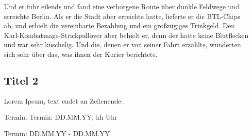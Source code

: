 Und er fuhr eilends und fand eine verborgene Route über dunkle Feldwege und erreichte Berlin.
Als er die Stadt aber erreichte hatte, lieferte er die BTL-Chips ab, und erhielt die vereinbarte Bezahlung und ein großzügiges Trinkgeld.
Den Karl-Kombatmage-Strickpullover aber behielt er, denn der hatte keine Blutflecken und war sehr kuschelig.
Und die, denen er von seiner Fahrt erzählte, wunderten sich sehr über das, was ihnen der Kurier berichtete.



\subsection{Titel 2}
Lorem Ipsum, text endet an Zeilenende.


\begin{termine}
\item Termin: Termin: DD.MM.YY, hh Uhr
  \item Termin: DD.MM.YY - DD.MM.YY
\end{termine}


